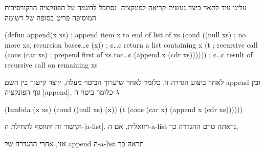 עלינו עוד לתאר כיצד נעשית קריאה לפונקציה. נסתכל לדוגמה על הפונקציה הרקורסיבית
המוסיפה פריט בסופה של רשימה
\begin{LISP}
(defun append(x xs) ; append item x to end of list of xs
  (cond ((null xs) ; no more xs, recursion base¢…¢
          (x)) ; ¢…¢ return a list containing x
        (t ; recursive call
          (cons
            (car xs) ; prepend first of xs to¢…¢
            (append x (cdr xs)))))) ; ¢…¢ result of recursive call on remaining xs
\end{LISP}
לאחר ביצוע הגדרה זו, כלומר לאחר שיערוך הביטוי מעלה, יווצר קישור בין השם append
ובין גוף הפונקציה \E|append|, כלומר ביטוי ה-$λ$
\begin{LISP}
(lambda (x xs)
  (cond ((null xs) (x))
        (t (cons
              (car x)
              (append x (cdr xs))))))
\end{LISP}
וקישור זה יתווסף לתחילת ה-\E|a-list|. ויזואלית,
אם ה-a-list נראתה טרם ההגדרה כך,
\begin{LTR}
\end{LTR}
אזי, אחרי ההגדרה של append ה-a-list תראה כך
